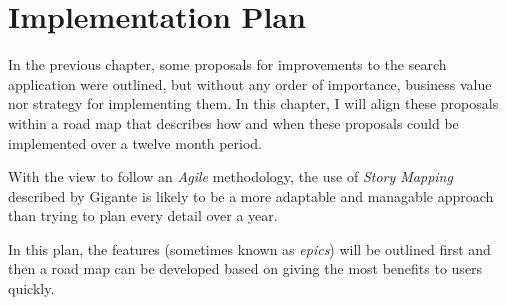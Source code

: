 \chapter{Implementation Plan}

In the previous chapter, some proposals for improvements to
the search application were outlined, but without any order
of importance, business value nor strategy for implementing them.
In this chapter, I will align these proposals within a road map
that describes how and when these proposals could be implemented
over a twelve month period.

With the view to follow an \emph{Agile} methodology, the use
of \emph{Story Mapping} described by Gigante\cite{gigante2013creating}
is likely to be a more adaptable and managable approach than
trying to plan every detail over a year.

In this plan, the features (sometimes known as \emph{epics}) will
be outlined first and then a road map can be developed based
on giving the most benefits to users quickly.





